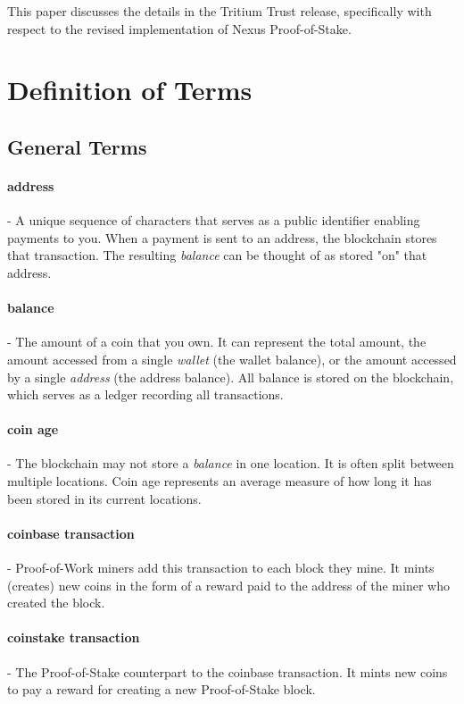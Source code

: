 \documentclass[11pt]{article}
\begin{document}
\noindent This paper discusses the details in the Tritium Trust release, specifically with respect to the revised implementation of Nexus Proof-of-Stake.

\bigskip

\section{Definition of Terms}

\subsection{General Terms}

\paragraph{address}- A unique sequence of characters that serves as a public identifier enabling payments to you. When a payment is sent to an address, the blockchain stores that transaction. The resulting \textit{balance} can be thought of as stored "on" that address.

\paragraph{balance}- The amount of a coin that you own. It can represent the total amount, the amount accessed from a single \textit{wallet} (the wallet balance), or the amount accessed by a single \textit{address} (the address balance). All balance is stored on the blockchain, which serves as a ledger recording all transactions. 

\paragraph{coin age}- The blockchain may not store a \textit{balance} in one location. It is often split between multiple locations. Coin age represents an average measure of how long it has been stored in its current locations.  

\paragraph{coinbase transaction}- Proof-of-Work miners add this transaction to each block they mine. It mints (creates) new coins in the form of a reward paid to the address of the miner who created the block.

\paragraph{coinstake transaction}- The Proof-of-Stake counterpart to the coinbase transaction. It mints new coins to pay a reward for creating a new Proof-of-Stake block.
\end{document}
